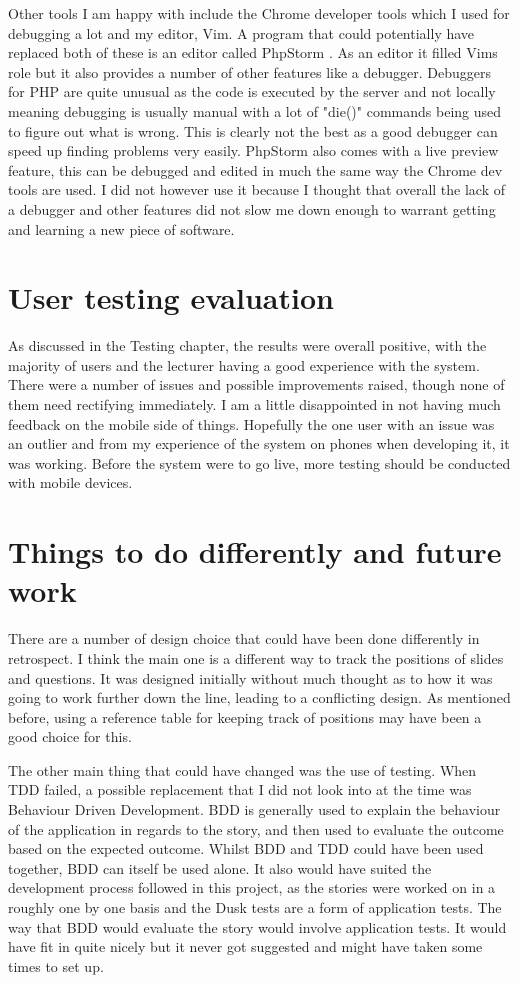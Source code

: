 Other tools I am happy with include the Chrome developer tools which I used for debugging a lot and my editor, Vim. A program that could potentially have replaced both of these is an editor called PhpStorm \cite{phpstorm}. As an editor it filled Vims role but it also provides a number of other features like a debugger. Debuggers for PHP are quite unusual as the code is executed by the server and not locally meaning debugging is usually manual with a lot of "die()" commands being used to figure out what is wrong. This is clearly not the best as a good debugger can speed up finding problems very easily. PhpStorm also comes with a live preview feature, this can be debugged and edited in much the same way the Chrome dev tools are used. I did not however use it because I thought that overall the lack of a debugger and other features did not slow me down enough to warrant getting and learning a new piece of software.

\section{User testing evaluation}
As discussed in the Testing chapter, the results were overall positive, with the majority of users and the lecturer having a good experience with the system. There were a number of issues and possible improvements raised, though none of them need rectifying immediately. I am a little disappointed in not having much feedback on the mobile side of things. Hopefully the one user with an issue was an outlier and from my experience of the system on phones when developing it, it was working. Before the system were to go live, more testing should be conducted with mobile devices.

\section{Things to do differently and future work}
There are a number of design choice that could have been done differently in retrospect. I think the main one is a different way to track the positions of slides and questions. It was designed initially without much thought as to how it was going to work further down the line, leading to a conflicting design. As mentioned before, using a reference table for keeping track of positions may have been a good choice for this.

The other main thing that could have changed was the use of testing. When TDD failed, a possible replacement that I did not look into at the time was Behaviour Driven Development\cite{bdd}. BDD is generally used to explain the behaviour of the application in regards to the story, and then used to evaluate the outcome based on the expected outcome. Whilst BDD and TDD could have been used together, BDD can itself be used alone. It also would have suited the development process followed in this project, as the stories were worked on in a roughly one by one basis and the Dusk tests are a form of application tests. The way that BDD would evaluate the story would involve application tests. It would have fit in quite nicely but it never got suggested and might have taken some times to set up.

